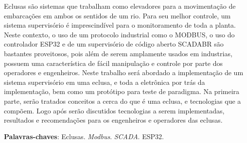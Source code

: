 \begin{resumo}
Eclusas são sistemas que trabalham como elevadores para a movimentação de embarcações em ambos os sentidos de um rio. Para seu melhor controle, um sistema supervisório é imprescindível para o monitoramento de toda a planta. Neste contexto, o uso de um protocolo industrial como o MODBUS, o uso do controlador ESP32 e de um supervisório de código aberto SCADABR são bastantes proveitosos, pois além de serem amplamente usados em industrias, possuem uma característica de fácil manipulação e controle por parte dos operadores e engenheiros. Neste trabalho será abordado a implementação de um sistema supervisório em uma eclusa, e toda a eletrônica por trás da implementação, bem como um protótipo para teste de paradigma. Na primeira parte, serão tratados conceitos a cerca do que é uma eclusa, e tecnologias que a compõem. Logo após serão discutidos tecnologias a serem implementadas, resultados e recomendações para os engenheiros e operadores das eclusas. 

 \vspace{\onelineskip}
    
 \noindent
 \textbf{Palavras-chaves}: Eclusas. \textit{Modbus}. \textit{SCADA}. ESP32.
\end{resumo}

